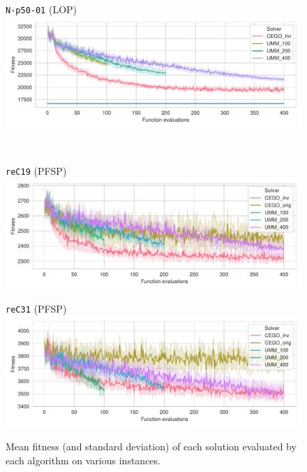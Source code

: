 \documentclass[sigconf,dvipsnames]{acmart}
\begin{document}
\begin{figure}[tb]
\begin{minipage}{0.49\linewidth}
  \texttt{N-p50-01} (LOP)\\[-0.5ex]
  \includegraphics[width=\textwidth]{../img/fitness_lop_RandB_N-p50-01}
\end{minipage}
\\
\begin{minipage}{0.49\linewidth}
  \texttt{reC19} (PFSP)\\[-0.5ex]
  \includegraphics[width=\textwidth]{../img/fitness_pfsp_rec19_txt}
\end{minipage}
\begin{minipage}{0.49\linewidth}
  \texttt{reC31} (PFSP)\\[-0.5ex]
  \includegraphics[width=\textwidth]{../img/fitness_pfsp_rec31_txt}
\end{minipage}
\label{fig:results}
\caption{Mean fitness  (and standard deviation)  of each solution evaluated by each algorithm on various instances.\label{fig:results}}
\end{figure}
\end{document}
